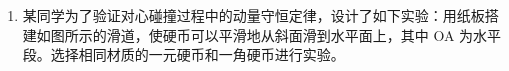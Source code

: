 \documentclass[\gkver]{gaokaozhenti}
\begin{document}
\begin{enumerate}
{	可得

	$\frac{x_{MN}}{x_{PQ}}=\frac{x_{1}}{x_{2}}=\frac{2}{1}$

	选项 C 正确；

	D．两棒最后停止时，弹簧处于原长位置，此时两棒间距增加了 $L$，由上述分析可知，MN 向左位置移动 $\frac{2L}{3}$，PQ 位置向右移动 $\frac{L}{3}$，则

	$q=\overline{I}\Delta t=\frac{\Delta\Phi}{R_{\text{总}}}=\frac{2B\frac{2L}{3}d+B\frac{L}{3}2d}{3R}=\frac{2BLd}{3R}$

	选项 D 错误。

	故选 AC。
}

\item
某同学为了验证对心碰撞过程中的动量守恒定律，设计了如下实验：用纸板搭建如图所示的滑道，使硬币可以平滑地从斜面滑到水平面上，其中 OA 为水平段。选择相同材质的一元硬币和一角硬币进行实验。


\end{enumerate}
\end{document}
